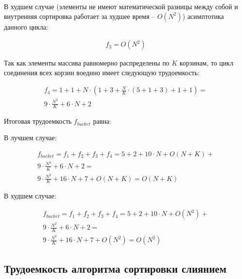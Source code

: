В худшем случае (элементы не имеют математической разницы между собой и внутренняя сортировка работает за худшее время -- $O(N^2)$) асимптотика данного цикла:

\begin{equation}
	\label{eq:bucketPart3}
	\begin{gathered}
		f_3 = O(N^2)
	\end{gathered}
\end{equation}

Так как элементы массива равномерно распределены по $K$ корзинам, то цикл соединения всех корзин воедино имеет следующую трудоемкость:


\begin{equation}
	\label{eq:bucketPart4}
	\begin{gathered}
		f_4 = 1 + 1 + N \cdot (1 + 3 + \frac{N}{K} \cdot (5 + 1 + 3) + 1 + 1) = \\
		9 \cdot \frac{N^2}{K} + 6 \cdot N + 2
	\end{gathered}
\end{equation}

Итоговая трудоемкость $f_{bucket}$ равна:

В лучшем случае:

\begin{equation}
	\label{eq:bucketFull1}
	\begin{gathered}
		f_{bucket} = f_1 + f_2 + f_3 + f_4 = 5 + 2 + 10 \cdot N + O(N + K) + \\
		9 \cdot \frac{N^2}{K} + 6 \cdot N + 2 =  \\
		9 \cdot \frac{N^2}{K} + 16 \cdot N + 7 + O(N + K) = O(N + K)
	\end{gathered}
\end{equation}

В худшем случае:

\begin{equation}
	\label{eq:bucketFull2}
	\begin{gathered}
		f_{bucket} = f_1 + f_2 + f_3 + f_4 = 5 + 2 + 10 \cdot N + O(N^2) + \\
		9 \cdot \frac{N^2}{K} + 6 \cdot N + 2 =  \\
		9 \cdot \frac{N^2}{K} + 16 \cdot N + 7 + O(N^2) = O(N^2)
	\end{gathered}
\end{equation}

\subsection{Трудоемкость алгоритма сортировки слиянием}

